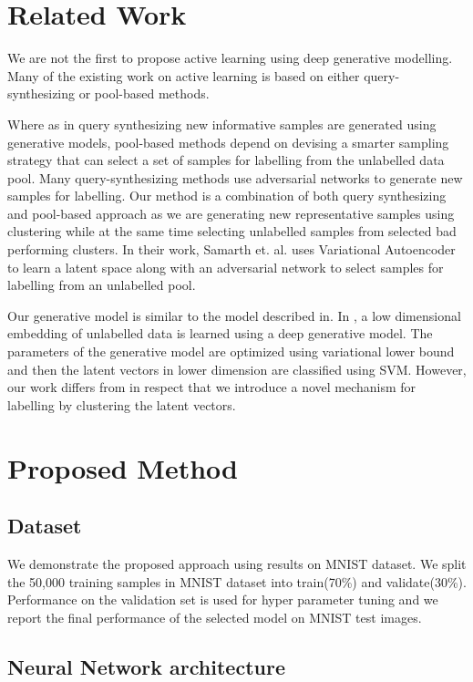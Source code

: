 \documentclass[runningheads]{llncs}
\begin{document}
\section{Related Work}
We are not the first to propose active learning using deep generative modelling.
Many of the existing work on active learning is based on either query-synthesizing or  pool-based methods.

Where as in query synthesizing new informative samples are generated using generative models, pool-based methods\cite{wang_2016,beluch_2018} depend on devising a smarter sampling strategy that can select a set of samples for labelling from the unlabelled data pool.
Many query-synthesizing methods use adversarial networks\cite{mahapatra_2018,mayer_2020} to generate new samples for labelling.
Our method is a combination of both query synthesizing and pool-based approach as we are generating new representative samples using clustering while at the same time selecting unlabelled samples from selected bad performing clusters.
In their work, Samarth et. al.\cite{vaal} uses Variational Autoencoder to learn a latent space along with an adversarial network to select samples for labelling from an unlabelled pool.

Our generative model is similar to the model described in\cite{kingma_2014}.
In \cite{kingma_2014}, a low dimensional embedding of unlabelled data is learned using a deep generative model.
The parameters of the generative model are optimized using variational lower bound and then the latent vectors in lower dimension are classified using SVM.
However, our work differs from \cite{kingma_2014} in respect that we introduce a novel mechanism for labelling by clustering the latent vectors.

\section{Proposed Method}

\subsection{Dataset}
We demonstrate the proposed approach using results on MNIST dataset.
We split the 50,000 training samples in MNIST dataset into train(70\%) and validate(30\%).
Performance on the validation set is used for hyper parameter tuning and we report the final performance of the selected model on MNIST test images.

\subsection{Neural Network architecture}
\end{document}
